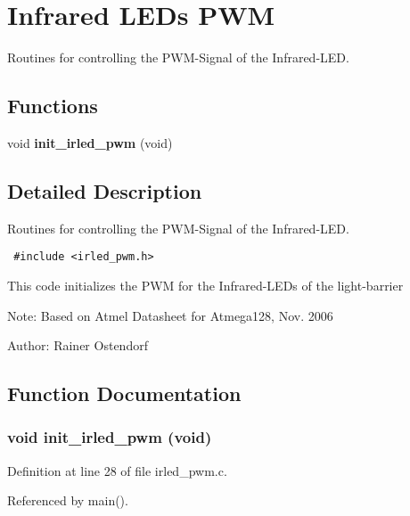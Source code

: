 \section{Infrared LEDs PWM}
\label{group__ro__irpwm}
Routines for controlling the PWM-Signal of the Infrared-LED.  
\subsection*{Functions}
\begin{CompactItemize}
\item 
void {\bf init\_\-irled\_\-pwm} (void)
\end{CompactItemize}


\subsection{Detailed Description}
Routines for controlling the PWM-Signal of the Infrared-LED. 



\begin{Code}\begin{verbatim} #include <irled_pwm.h> 
\end{verbatim}\end{Code}



This code initializes the PWM for the Infrared-LEDs of the light-barrier

\begin{Desc}
\item[Note:]Based on Atmel Datasheet for Atmega128, Nov. 2006 \end{Desc}
\begin{Desc}
\item[Author:]Rainer Ostendorf \end{Desc}


\subsection{Function Documentation}
\subsubsection{\setlength{\rightskip}{0pt plus 5cm}void init\_\-irled\_\-pwm (void)}\label{group__ro__irpwm_g4581c6293001abcbd0b17b95d26958f6}




Definition at line 28 of file irled\_\-pwm.c.

Referenced by main().